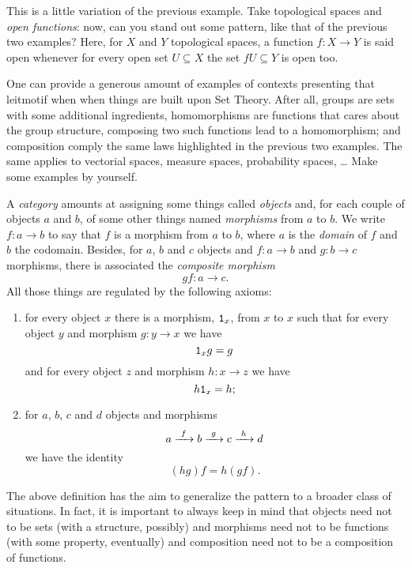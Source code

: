 \begin{exercise}
This is a little variation of the previous example. Take topological spaces and {\em open functions}: now, can you stand out some pattern, like that of the previous two examples? Here, for \(X\) and \(Y\) topological spaces, a function \(f : X \to Y\) is said open whenever for every open set \(U \subseteq X\) the set \(f U \subseteq Y\) is open too.
\end{exercise}

\begin{exercise}
One can provide a generous amount of examples of contexts presenting that leitmotif when when things are built upon Set Theory. After all, groups are sets with some additional ingredients, homomorphisms are functions that cares about the group structure, composing two such functions lead to a homomorphism; and composition comply the same laws highlighted in the previous two examples. The same applies to vectorial spaces, measure spaces, probability spaces, \dots{} Make some examples by yourself.
\end{exercise}

\begin{definition}[Categories]
A {\em category} amounts at assigning some things called {\em objects} and, for each couple of objects \(a\) and \(b\), of some other things named {\em morphisms} from \(a\) to \(b\). We write \(f : a \to b\) to say that \(f\) is a morphism from \(a\) to \(b\), where \(a\) is the {\em domain} of \(f\) and \(b\) the codomain. Besides, for \(a\), \(b\) and \(c\) objects and \(f : a \to b\) and \(g : b \to c\) morphisms, there is associated the {\em composite morphism}
\[gf : a \to c .\]
All those things are regulated by the following axioms:
\begin{enumerate}
\item for every object \(x\) there is a morphism, \(\mathtt 1_x\), from \(x\) to \(x\) such that for every object \(y\) and morphism \(g : y \to x\) we have
\[\mathtt 1_x g = g\]
and for every object \(z\) and morphism \(h : x \to z\) we have
\[h \mathtt 1_x = h ;\]
\item for \(a\), \(b\), \(c\) and \(d\) objects and morphisms
\[a \xrightarrow{\ f\ } b \xrightarrow{\ g\ } c \xrightarrow{\ h\ } d\]
we have the identity
\[(h g) f = h (g f) .\]
\end{enumerate}
\end{definition}

The above definition has the aim to generalize the  pattern to a broader class of situations. In fact, it is important to always keep in mind that objects need not to be sets (with a structure, possibly) and morphisms need not to be functions (with some property, eventually) and composition need not to be a composition of functions.

